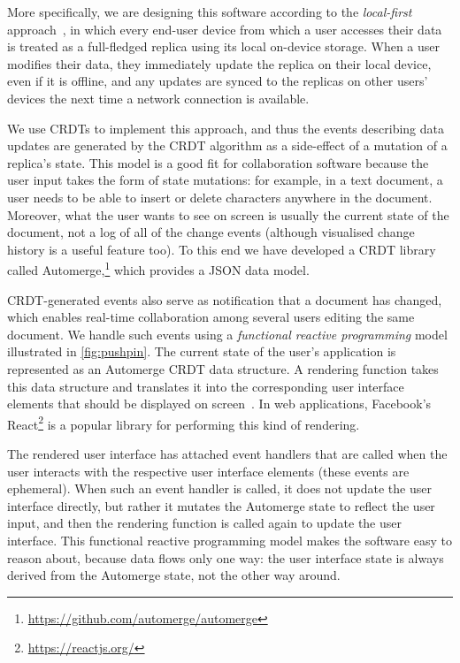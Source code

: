 \documentclass[sigconf]{acmart}
\begin{document}
More specifically, we are designing this software according to the \emph{local-first} approach~\cite{Kleppmann:2019}, in which every end-user device from which a user accesses their data is treated as a full-fledged replica using its local on-device storage.
When a user modifies their data, they immediately update the replica on their local device, even if it is offline, and any updates are synced to the replicas on other users' devices the next time a network connection is available.

We use CRDTs to implement this approach, and thus the events describing data updates are generated by the CRDT algorithm as a side-effect of a mutation of a replica's state.
This model is a good fit for collaboration software because the user input takes the form of state mutations: for example, in a text document, a user needs to be able to insert or delete characters anywhere in the document.
Moreover, what the user wants to see on screen is usually the current state of the document, not a log of all of the change events (although visualised change history is a useful feature too).
To this end we have developed a CRDT library called Automerge,\footnote{\url{https://github.com/automerge/automerge}} which provides a JSON data model.

CRDT-generated events also serve as notification that a document has changed, which enables real-time collaboration among several users editing the same document.
We handle such events using a \emph{functional reactive programming} model illustrated in \autoref{fig:pushpin}.
The current state of the user's application is represented as an Automerge CRDT data structure.
A rendering function takes this data structure and translates it into the corresponding user interface elements that should be displayed on screen~\cite{vanHardenberg:2020}.
In web applications, Facebook's React\footnote{\url{https://reactjs.org/}} is a popular library for performing this kind of rendering.

The rendered user interface has attached event handlers that are called when the user interacts with the respective user interface elements (these events are ephemeral).
When such an event handler is called, it does not update the user interface directly, but rather it mutates the Automerge state to reflect the user input, and then the rendering function is called again to update the user interface.
This functional reactive programming model makes the software easy to reason about, because data flows only one way: the user interface state is always derived from the Automerge state, not the other way around.
\end{document}
